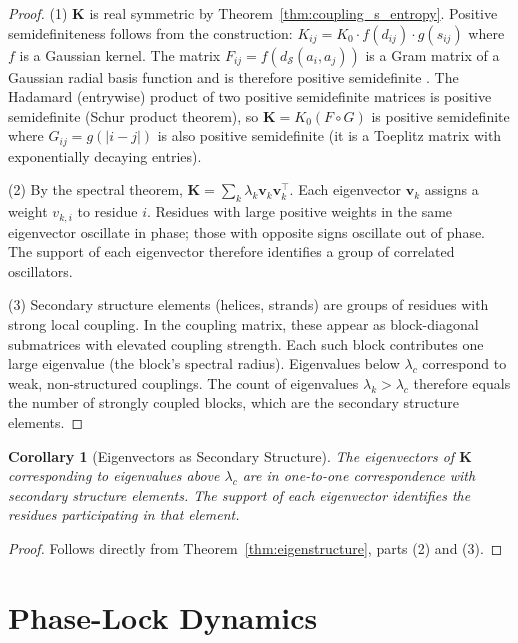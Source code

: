 \documentclass[11pt,twocolumn,a4paper]{article}
\newtheorem{corollary}[theorem]{Corollary}
\theoremstyle{definition}
\theoremstyle{remark}
\newcommand{\Sspace}{\mathcal{S}}
\newcommand{\coupmat}{\mathbf{K}}
\begin{document}
\begin{proof}
(1) $\coupmat$ is real symmetric by Theorem~\ref{thm:coupling_s_entropy}. Positive semidefiniteness follows from the construction: $K_{ij} = K_0 \cdot f(d_{ij}) \cdot g(s_{ij})$ where $f$ is a Gaussian kernel. The matrix $F_{ij} = f(d_{\Sspace}(a_i, a_j))$ is a Gram matrix of a Gaussian radial basis function and is therefore positive semidefinite \citep{oppenheim1999}. The Hadamard (entrywise) product of two positive semidefinite matrices is positive semidefinite (Schur product theorem), so $\coupmat = K_0 (F \circ G)$ is positive semidefinite where $G_{ij} = g(|i-j|)$ is also positive semidefinite (it is a Toeplitz matrix with exponentially decaying entries).

(2) By the spectral theorem, $\coupmat = \sum_k \lambda_k \mathbf{v}_k \mathbf{v}_k^\top$. Each eigenvector $\mathbf{v}_k$ assigns a weight $v_{k,i}$ to residue $i$. Residues with large positive weights in the same eigenvector oscillate in phase; those with opposite signs oscillate out of phase. The support of each eigenvector therefore identifies a group of correlated oscillators.

(3) Secondary structure elements (helices, strands) are groups of residues with strong local coupling. In the coupling matrix, these appear as block-diagonal submatrices with elevated coupling strength. Each such block contributes one large eigenvalue (the block's spectral radius). Eigenvalues below $\lambda_c$ correspond to weak, non-structured couplings. The count of eigenvalues $\lambda_k > \lambda_c$ therefore equals the number of strongly coupled blocks, which are the secondary structure elements.
\end{proof}

\begin{corollary}[Eigenvectors as Secondary Structure]
\label{cor:eigenvectors_ss}
The eigenvectors of $\coupmat$ corresponding to eigenvalues above $\lambda_c$ are in one-to-one correspondence with secondary structure elements. The support of each eigenvector identifies the residues participating in that element.
\end{corollary}

\begin{proof}
Follows directly from Theorem~\ref{thm:eigenstructure}, parts (2) and (3).
\end{proof}



\section{Phase-Lock Dynamics}
\label{sec:phase_lock}
\end{document}
